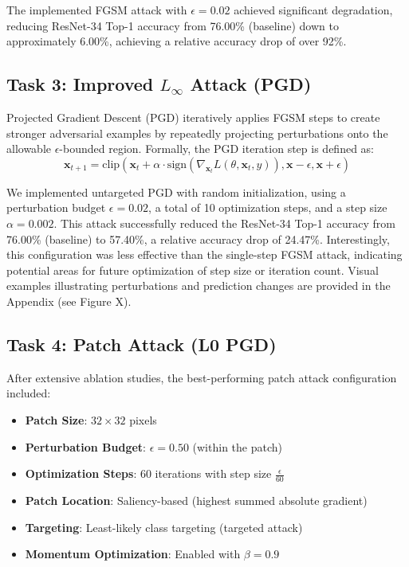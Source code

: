 \documentclass[letterpaper]{article}
\begin{document}
The implemented FGSM attack with $\epsilon=0.02$ achieved significant degradation, reducing ResNet-34 Top-1 accuracy from 76.00\% (baseline) down to approximately 6.00\%, achieving a relative accuracy drop of over 92\%.

\subsection{Task 3: Improved $L_\infty$ Attack (PGD)}
Projected Gradient Descent (PGD) iteratively applies FGSM steps to create stronger adversarial examples by repeatedly projecting perturbations onto the allowable $\epsilon$-bounded region. Formally, the PGD iteration step is defined as:
\[
\mathbf{x}_{t+1} = \text{clip}\left(\mathbf{x}_t + \alpha \cdot \text{sign}\left(\nabla_{\mathbf{x}_t} L(\theta, \mathbf{x}_t, y)\right), \mathbf{x}-\epsilon, \mathbf{x}+\epsilon\right)
\]

We implemented untargeted PGD with random initialization, using a perturbation budget $\epsilon=0.02$, a total of 10 optimization steps, and a step size $\alpha=0.002$. This attack successfully reduced the ResNet-34 Top-1 accuracy from 76.00\% (baseline) to 57.40\%, a relative accuracy drop of 24.47\%. Interestingly, this configuration was less effective than the single-step FGSM attack, indicating potential areas for future optimization of step size or iteration count. Visual examples illustrating perturbations and prediction changes are provided in the Appendix (see Figure X).


\subsection{Task 4: Patch Attack (L0 PGD)}
After extensive ablation studies, the best-performing patch attack configuration included:
\begin{itemize}
    \item \textbf{Patch Size}: $32 \times 32$ pixels
    \item \textbf{Perturbation Budget}: $\epsilon=0.50$ (within the patch)
    \item \textbf{Optimization Steps}: 60 iterations with step size $\frac{\epsilon}{60}$
    \item \textbf{Patch Location}: Saliency-based (highest summed absolute gradient)
    \item \textbf{Targeting}: Least-likely class targeting (targeted attack)
    \item \textbf{Momentum Optimization}: Enabled with $\beta=0.9$
\end{itemize}
\end{document}
